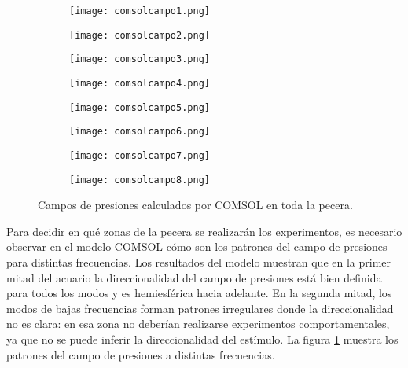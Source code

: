 \begin{figure}[H]
	\begin{subfigure}[b]{.48\textwidth}
		\centering
		\texttt{[image: comsolcampo1.png]}
	\end{subfigure}
	\begin{subfigure}[b]{.48\textwidth}
		\centering
		\texttt{[image: comsolcampo2.png]}
	\end{subfigure}
	
	\begin{subfigure}[b]{.48\textwidth}
		\centering
		\texttt{[image: comsolcampo3.png]}
	\end{subfigure}
	\begin{subfigure}[b]{.48\textwidth}
		\centering
		\texttt{[image: comsolcampo4.png]}
	\end{subfigure}
	
	\begin{subfigure}[b]{.48\textwidth}
		\centering
		\texttt{[image: comsolcampo5.png]}
	\end{subfigure}
	\begin{subfigure}[b]{.48\textwidth}
		\centering
		\texttt{[image: comsolcampo6.png]}
	\end{subfigure}
	
	\begin{subfigure}[b]{.48\textwidth}
		\centering
		\texttt{[image: comsolcampo7.png]}
	\end{subfigure}
	\begin{subfigure}[b]{.48\textwidth}
		\centering
		\texttt{[image: comsolcampo8.png]}
	\end{subfigure}
	\caption{Campos de presiones calculados por COMSOL en toda la pecera.}
	\label{fig:campos}
\end{figure}

Para decidir en qué zonas de la pecera se realizarán los experimentos, es necesario observar en el modelo COMSOL cómo son los patrones del campo de presiones para distintas frecuencias. Los resultados del modelo muestran que en la primer mitad del acuario la direccionalidad del campo de presiones está bien definida para todos los modos y es hemiesférica hacia adelante. En la segunda mitad, los modos de bajas frecuencias forman patrones irregulares donde la direccionalidad no es clara: en esa zona no deberían realizarse experimentos comportamentales, ya que no se puede inferir la direccionalidad del estímulo. La figura \ref{fig:campos} muestra los patrones del campo de presiones a distintas frecuencias.

